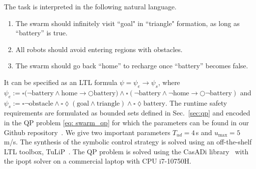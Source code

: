 \documentclass[letterpaper, 10 pt, conference]{ieeeconf}
\begin{document}
The task is interpreted in the following natural language.
\begin{enumerate}
\item The swarm should infinitely visit ``goal" in ``triangle" formation, as long as ``battery'' is true.
\item All robots should avoid entering regions with obstacles.
\item The swarm should go back ``home'' to recharge once ``battery'' becomes false.
\end{enumerate}
It can be specified as an LTL formula $\psi \!=\! \psi_e \!\rightarrow\! \psi_s$, where $\psi_e := \square (\neg \mathrm{battery} \wedge  \mathrm{home} \rightarrow \bigcirc \mathrm{battery)} \wedge \square (\neg \mathrm{battery} \wedge  \neg \mathrm{home} \rightarrow \bigcirc \neg \mathrm{battery})$ and $\psi_s := \square \neg \mathrm{obstacle}
\wedge \square \lozenge (\mathrm{goal} \wedge \mathrm{triangle})
\wedge \square \lozenge \mathrm{battery}$.
The runtime safety requirements are formulated as bounded sets defined in Sec.~\ref{sec:qp} and encoded in the QP problem \eqref{eq: swarm_qp} for which the parameters can be found in our Github repository~\cite{ourCode}. We give two important parameters $T_{ud}\!=\!4\,$s and $u_{\max}\!=\!5\,$m/s.
The synthesis of the symbolic control strategy is solved using an off-the-shelf LTL toolbox, TuLiP~\cite{tulip2016}.
The QP problem is solved using the CasADi library~\cite{Andersson2019} with the ipopt solver on a commercial laptop with CPU i7-10750H.
\end{document}
